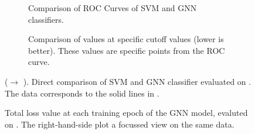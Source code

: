 \documentclass[
	fontsize=10pt, %
	twoside=false, %
	secnumdepth=1, %
  toc=indentunnumbered %
]{kaobook}
\begin{document}





\begin{figure}[h]
  \centering
  \begin{subfigure}[h]{0.49\linewidth}
    \caption{Comparison of ROC Curves of SVM and GNN classifiers.}
  \end{subfigure}
  \begin{subfigure}[h]{0.49\linewidth}
    \caption{Comparison of \FPR values at specific \TPR cutoff values (lower is better). These
      values are specific points from the ROC curve.}
  \end{subfigure}
  \caption{(\ADMap $\rightarrow$ \ReconMap).
    Direct comparison of SVM and GNN classifier evaluated on \ReconMap. The data
    corresponds to the solid lines in .}
  \label{fig:svm-repro-reconmapolder-roc-train-test}
\end{figure}
\begin{figure}[h]
  \centering
  \begin{subfigure}[h]{0.49\linewidth}
  \end{subfigure}
  \begin{subfigure}[h]{0.49\linewidth}
  \end{subfigure}
  \caption{Total loss value at each training epoch of the GNN model, evaluted on
    \ReconMap. The right-hand-side plot a focussed view on the same data.}
  \label{fig:svm-repro-reconmapolder-loss}
\end{figure}
\end{document}
